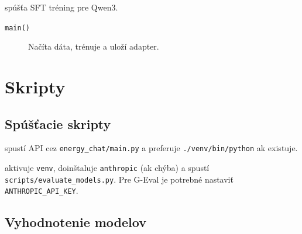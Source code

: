 \textbf{} spúšťa SFT tréning pre Qwen3.
\begin{description}
	\item[\texttt{main()}] Načíta dáta, trénuje a uloží adapter.
\end{description}

\section{Skripty}

\subsection{Spúšťacie skripty}

\textbf{} spustí API cez \texttt{energy\_chat/main.py} a preferuje \texttt{./venv/bin/python} ak existuje.

\textbf{} aktivuje \texttt{venv}, doinštaluje \texttt{anthropic} (ak chýba) a spustí \texttt{scripts/evaluate_models.py}. Pre G-Eval je potrebné nastaviť \texttt{ANTHROPIC\_API\_KEY}.

\subsection{Vyhodnotenie modelov}

